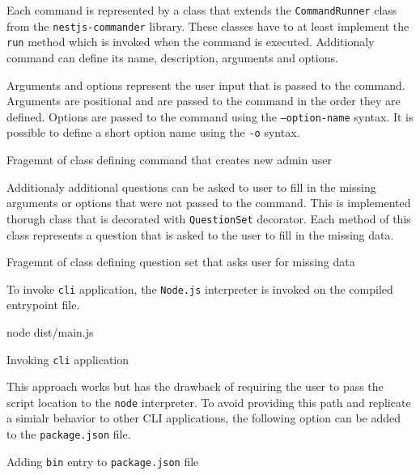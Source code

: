 \documentclass[../main.tex]{subfiles}
\begin{document}
Each command is represented by a class that extends the \texttt{CommandRunner} class from the \texttt{nestjs-commander} library.
These classes have to at least implement the \texttt{run} method which is invoked when the command is executed.
Additionaly command can define its name, description, arguments and options.

Arguments and options represent the user input that is passed to the command.
Arguments are positional and are passed to the command in the order they are defined.
Options are passed to the command using the \texttt{--option-name} syntax.
It is possible to define a short option name using the \texttt{-o} syntax.

\begin{listing}[H]
  \caption{Fragemnt of class defining command that creates new admin user}
\end{listing}

Additionaly additional questions can be asked to user to fill in the missing arguments or options that were not passed to the command.
This is implemented thorugh class that is decorated with \texttt{QuestionSet} decorator. Each method of this class represents a question that is asked to the user to fill in the missing data.

\begin{listing}[H]
  \caption{Fragemnt of class defining question set that asks user for missing data}
\end{listing}

To invoke \texttt{cli} application, the \texttt{Node.js} interpreter is invoked on the compiled entrypoint file.

\begin{listing}[H]
  \begin{bashcode}
    node dist/main.js
  \end{bashcode}
  \caption{Invoking \texttt{cli} application}
\end{listing}

This approach works but has the drawback of requiring the user to pass the script location to the \texttt{node} interpreter.
To avoid providing this path and replicate a simialr behavior to other CLI applications, the following option can be added to the \texttt{package.json} file.

\begin{listing}[H]
  \caption{Adding \texttt{bin} entry to \texttt{package.json} file}
\end{listing}
\end{document}
